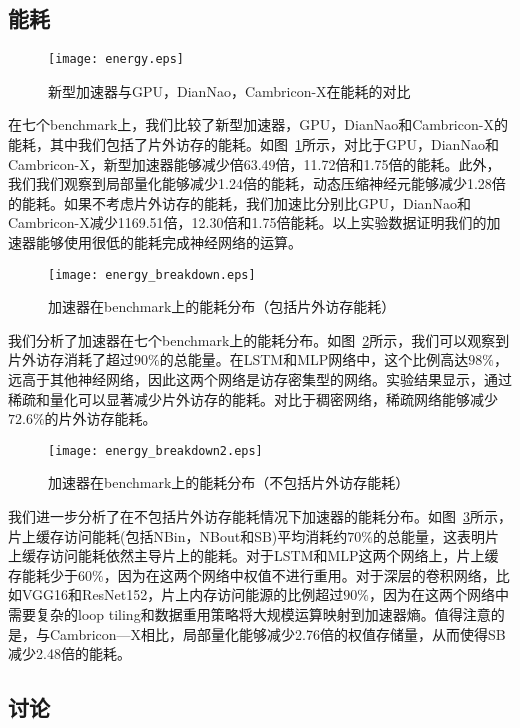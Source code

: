 \subsection{能耗}
\begin{figure}[h]
\centering
\texttt{[image: energy.eps]}
\caption{新型加速器与GPU，DianNao，Cambricon-X在能耗的对比}
\label{fig:energy}
\end{figure}

在七个benchmark上，我们比较了新型加速器，GPU，DianNao和Cambricon-X的能耗，其中我们包括了片外访存的能耗。如图~\ref{fig:energy}所示，对比于GPU，DianNao和Cambricon-X，新型加速器能够减少倍63.49倍，11.72倍和1.75倍的能耗。此外，我们我们观察到局部量化能够减少1.24倍的能耗，动态压缩神经元能够减少1.28倍的能耗。如果不考虑片外访存的能耗，我们加速比分别比GPU，DianNao和Cambricon-X减少1169.51倍，12.30倍和1.75倍能耗。以上实验数据证明我们的加速器能够使用很低的能耗完成神经网络的运算。


\begin{figure}[h]
\centering
\texttt{[image: energy\_breakdown.eps]}
\caption{加速器在benchmark上的能耗分布（包括片外访存能耗）}
\label{fig:energy_breakdown}
\end{figure}

我们分析了加速器在七个benchmark上的能耗分布。如图~\ref{fig:energy_breakdown}所示，我们可以观察到片外访存消耗了超过$90\%$的总能量。在LSTM和MLP网络中，这个比例高达$98\%$，远高于其他神经网络，因此这两个网络是访存密集型的网络。实验结果显示，通过稀疏和量化可以显著减少片外访存的能耗。对比于稠密网络，稀疏网络能够减少$72.6\%$的片外访存能耗。

\begin{figure}[h]
\centering
\texttt{[image: energy\_breakdown2.eps]}
\caption{加速器在benchmark上的能耗分布（不包括片外访存能耗）}
\label{fig:energy_breakdown2}
\end{figure}

我们进一步分析了在不包括片外访存能耗情况下加速器的能耗分布。如图~\ref{fig:energy_breakdown2}所示，片上缓存访问能耗(包括NBin，NBout和SB)平均消耗约$70\%$的总能量，这表明片上缓存访问能耗依然主导片上的能耗。对于LSTM和MLP这两个网络上，片上缓存能耗少于$60\%$，因为在这两个网络中权值不进行重用。对于深层的卷积网络，比如VGG16和ResNet152，片上内存访问能源的比例超过$90\%$，因为在这两个网络中需要复杂的loop tiling和数据重用策略将大规模运算映射到加速器熵。值得注意的是，与Cambricon—X相比，局部量化能够减少2.76倍的权值存储量，从而使得SB减少2.48倍的能耗。

\subsection{讨论}

